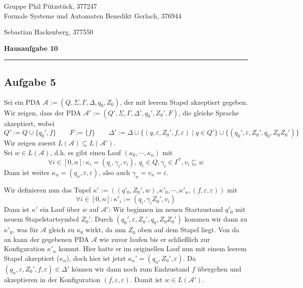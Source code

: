 \documentclass[a4paper,graphics,11pt]{article}
\newcommand{\aufgabe}[1]{\subsection*{Aufgabe #1}}
\begin{document}
\noindent Gruppe              \hfill Phil Pützstück, 377247\\
\noindent Formale Systeme und Automaten \hfill Benedikt Gerlach, 376944\\
\strut\hfill Sebastian Hackenberg, 377550\\
\begin{center}
	\LARGE{\textbf{Hausaufgabe 10}}
\end{center}
\begin{center}
\rule[0.1ex]{\textwidth}{1pt}
\end{center}



\aufgabe{5}
Sei ein PDA $\mathcal{A} := (Q, \Sigma, \Gamma, \Delta, q_0, Z_0)$, der mit
leerem Stapel akzeptiert gegeben.\\
Wir zeigen, dass der PDA $\mathcal{A}' := (Q', \Sigma, \Gamma, \Delta', q_0', Z_0', F)$,
die gleiche Sprache akzeptiert,
wobei
$$
    Q' := Q \cup \{q_0',f\}\qquad
    F := \{f\}\qquad
    \Delta' := \Delta \cup \{(q, \varepsilon, Z_0', f, \varepsilon) \mid q \in Q'\} \cup \{(q_0', \varepsilon, Z_0', q_0, Z_0Z_0')\}
$$
Wir zeigen zuerst $L(\mathcal{A}) \subseteq L(\mathcal{A}')$.\\
Sei $w \in L(\mathcal{A})$, d.h. es gibt einen Lauf $(\kappa_0, \cdots, \kappa_n)$
mit
$$
    \forall i \in [0,n] : \kappa_i = (q_i, \gamma_i, v_i),\ q_i \in Q, \gamma_i \in \Gamma^*, v_i \sqsubseteq w
$$
Dann ist weiter $\kappa_n = (q_n, \varepsilon, \varepsilon)$, also auch $\gamma_n = v_n = \varepsilon$.

Wir definieren nun das Tupel $\kappa' := ((q'_0, Z_0', w), \kappa'_0, \cdots, \kappa'_n, (f, \varepsilon, \varepsilon))$ mit
$$
    \forall i \in [0,n] : \kappa'_i := (q_i, \gamma_iZ_0',v_i)
$$
Dann ist $\kappa'$ ein Lauf über $w$ auf $\mathcal{A}'$: Wir beginnen im neuen Startzustand $q'_0$ mit neuem
Stapelstartsymbol $Z_0'$. Durch $(q_0', \varepsilon, Z_0', q_0, Z_0Z_0')$ kommen wir dann zu $\kappa'_0$,
was für $\mathcal{A}$ gleich zu $\kappa_0$ wirkt, da nun $Z_0$ oben auf dem Stapel liegt.
Von da an kann der gegebenen PDA $\mathcal{A}$ wie zuvor laufen bis er schließlich zur Konfiguration
$\kappa'_n$ kommt. Hier hatte er im originellen Lauf nun mit einem leerem Stapel akzeptiert ($\kappa_n$), doch
hier ist jetzt $\kappa_n' = (q_n, Z_0', \varepsilon)$. Da $(q_n, \varepsilon, Z_0', f, \varepsilon) \in \Delta'$
können wir dann noch zum Endzustand $f$ übergehen und akzeptieren in der Konfiguration $(f,\varepsilon,\varepsilon)$.
Damit ist $w \in L(\mathcal{A}')$.
\end{document}
